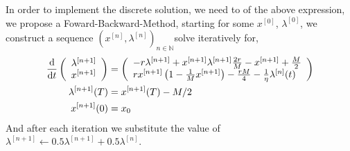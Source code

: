 In order to implement the discrete solution, we need to  of the above expression, we propose a Foward-Backward-Method, starting for some $x^{[0]}$, $\lambda^{[0]}$, we construct a sequence $\left(x^{[n]}, \lambda^{[n]}\right)_{n\in \mathbb{N}}$solve iteratively for,
\begin{align}
	\frac{\mathrm{d} }{{\mathrm{d} t}}\left(\begin{array}{l}
	\lambda^{[n+1]}\\x^{[n+1]}
	\end{array}\right)&= \left(\begin{array}{l}
	-r\lambda^{[n+1]}+x^{[n+1]}\lambda^{[n+1]} \frac{2r}{M}-x^{[n+1]}+\frac{M}{2}\\rx^{[n+1]}\left(1-\frac{1}{M}x^{[n+1]}\right)-\frac{rM}{4}-\frac{1}{\eta} \lambda^{[n]}(t)
	\end{array}\right)\label{eq: FBS}\\
	\lambda^{[n+1]}(T)&=x^{[n+1]}(T)-M/2\label{eq: FBSBoundary}\\
	x^{[n+1]}(0)&=x_0 
\end{align}
And after each iteration we substitute the value of 
$\lambda^{[n+1]}\leftarrow0.5\lambda^{[n+1]}+0.5 \lambda^{[n]}$. 

